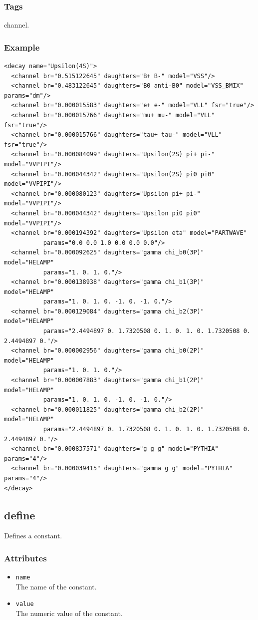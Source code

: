 \subsubsection*{Tags}
channel.
\subsubsection*{Example}
{\footnotesize
\begin{verbatim}
<decay name="Upsilon(4S)">
  <channel br="0.515122645" daughters="B+ B-" model="VSS"/>
  <channel br="0.483122645" daughters="B0 anti-B0" model="VSS_BMIX" params="dm"/>
  <channel br="0.000015583" daughters="e+ e-" model="VLL" fsr="true"/>
  <channel br="0.000015766" daughters="mu+ mu-" model="VLL" fsr="true"/>
  <channel br="0.000015766" daughters="tau+ tau-" model="VLL" fsr="true"/>
  <channel br="0.000084099" daughters="Upsilon(2S) pi+ pi-" model="VVPIPI"/>
  <channel br="0.000044342" daughters="Upsilon(2S) pi0 pi0" model="VVPIPI"/>
  <channel br="0.000080123" daughters="Upsilon pi+ pi-" model="VVPIPI"/>
  <channel br="0.000044342" daughters="Upsilon pi0 pi0" model="VVPIPI"/>
  <channel br="0.000194392" daughters="Upsilon eta" model="PARTWAVE"
           params="0.0 0.0 1.0 0.0 0.0 0.0"/>
  <channel br="0.000092625" daughters="gamma chi_b0(3P)" model="HELAMP"
           params="1. 0. 1. 0."/>
  <channel br="0.000138938" daughters="gamma chi_b1(3P)" model="HELAMP"
           params="1. 0. 1. 0. -1. 0. -1. 0."/>
  <channel br="0.000129084" daughters="gamma chi_b2(3P)" model="HELAMP"
           params="2.4494897 0. 1.7320508 0. 1. 0. 1. 0. 1.7320508 0. 2.4494897 0."/>
  <channel br="0.000002956" daughters="gamma chi_b0(2P)" model="HELAMP"
           params="1. 0. 1. 0."/>
  <channel br="0.000007883" daughters="gamma chi_b1(2P)" model="HELAMP"
           params="1. 0. 1. 0. -1. 0. -1. 0."/>
  <channel br="0.000011825" daughters="gamma chi_b2(2P)" model="HELAMP"
           params="2.4494897 0. 1.7320508 0. 1. 0. 1. 0. 1.7320508 0. 2.4494897 0."/>
  <channel br="0.000837571" daughters="g g g" model="PYTHIA" params="4"/>
  <channel br="0.000039415" daughters="gamma g g" model="PYTHIA" params="4"/>
</decay>
\end{verbatim}
}

\subsection{define}
Defines a constant.
\subsubsection*{Attributes}
\begin{itemize}
\item{\tt name}\\
      The name of the constant.
\item{\tt value}\\
      The numeric value of the constant.
\end{itemize}
